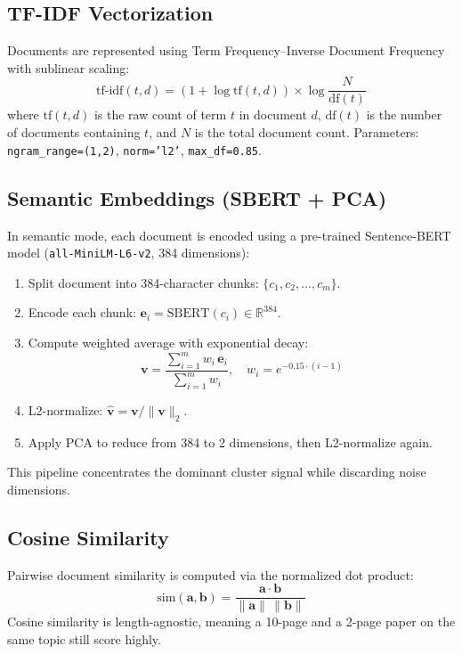 \documentclass[12pt, a4paper]{article}
\begin{document}
\subsection{TF-IDF Vectorization}
Documents are represented using Term Frequency--Inverse Document Frequency with sublinear scaling:
\begin{equation}
    \text{tf-idf}(t, d) = (1 + \log \text{tf}(t, d)) \times \log \frac{N}{\text{df}(t)}
\end{equation}
where $\text{tf}(t,d)$ is the raw count of term $t$ in document $d$, $\text{df}(t)$ is the number of documents containing $t$, and $N$ is the total document count. Parameters: \texttt{ngram\_range=(1,2)}, \texttt{norm='l2'}, \texttt{max\_df=0.85}.

\subsection{Semantic Embeddings (SBERT + PCA)}
In semantic mode, each document is encoded using a pre-trained Sentence-BERT model (\texttt{all-MiniLM-L6-v2}, 384 dimensions):
\begin{enumerate}[nosep]
    \item Split document into 384-character chunks: $\{c_1, c_2, \ldots, c_m\}$.
    \item Encode each chunk: $\mathbf{e}_i = \text{SBERT}(c_i) \in \mathbb{R}^{384}$.
    \item Compute weighted average with exponential decay:
    \begin{equation}
        \mathbf{v} = \frac{\sum_{i=1}^{m} w_i \, \mathbf{e}_i}{\sum_{i=1}^{m} w_i}, \quad w_i = e^{-0.15 \cdot (i-1)}
    \end{equation}
    \item L2-normalize: $\hat{\mathbf{v}} = \mathbf{v} / \|\mathbf{v}\|_2$.
    \item Apply PCA to reduce from 384 to 2 dimensions, then L2-normalize again.
\end{enumerate}
This pipeline concentrates the dominant cluster signal while discarding noise dimensions.

\subsection{Cosine Similarity}
Pairwise document similarity is computed via the normalized dot product:
\begin{equation}
    \text{sim}(\mathbf{a}, \mathbf{b}) = \frac{\mathbf{a} \cdot \mathbf{b}}{\|\mathbf{a}\| \, \|\mathbf{b}\|}
\end{equation}
Cosine similarity is length-agnostic, meaning a 10-page and a 2-page paper on the same topic still score highly.
\end{document}
